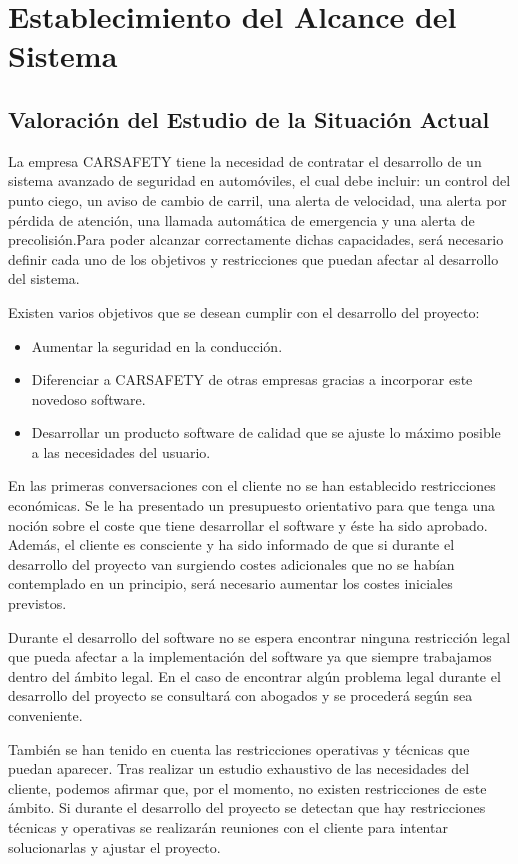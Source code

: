 

\section{Establecimiento del Alcance del Sistema}

\subsection{Valoración del Estudio de la Situación Actual}
\par La empresa CARSAFETY tiene la necesidad de contratar el desarrollo de un sistema avanzado de seguridad en automóviles, el cual debe incluir: un control del punto ciego, un aviso de cambio de carril, una alerta de velocidad, una alerta por pérdida de atención, una llamada automática de emergencia y una alerta de precolisión.Para poder alcanzar correctamente dichas capacidades, será necesario definir cada uno de los objetivos y restricciones que puedan afectar al desarrollo del sistema.
\par Existen varios objetivos que se desean cumplir con el desarrollo del proyecto:

\begin{itemize}[-]
\item Aumentar la seguridad en la conducción.
\item Diferenciar a CARSAFETY de otras empresas gracias a incorporar este novedoso software.
\item Desarrollar un producto software de calidad que se ajuste lo máximo posible a las necesidades del usuario.
\end {itemize}

\par En las primeras conversaciones con el cliente no se han establecido restricciones económicas. Se le ha presentado un presupuesto orientativo para que tenga una noción sobre el coste que tiene desarrollar el software y éste ha sido aprobado. Además, el cliente es consciente y ha sido informado de que si durante el desarrollo del proyecto van surgiendo costes adicionales que no se habían contemplado en un principio, será necesario aumentar los costes iniciales previstos.
\par Durante el desarrollo del software no se espera encontrar ninguna restricción legal que pueda afectar a la implementación del software ya que siempre trabajamos dentro del ámbito legal. En el caso de encontrar algún problema legal durante el desarrollo del proyecto se consultará con abogados y se procederá según sea conveniente.
\par También se han tenido en cuenta las restricciones operativas y técnicas que puedan aparecer. Tras realizar un estudio exhaustivo de las necesidades del cliente, podemos afirmar que, por el momento, no existen restricciones de este ámbito. Si durante el desarrollo del proyecto se detectan que hay restricciones técnicas y operativas se realizarán reuniones con el cliente para intentar solucionarlas y ajustar el proyecto.


